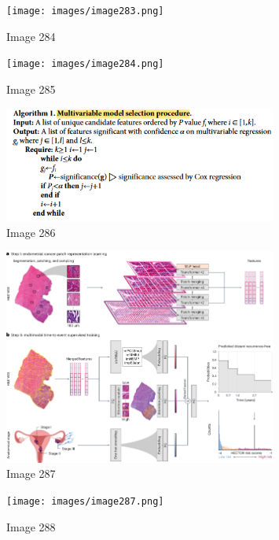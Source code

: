 \documentclass{article}%
\begin{document}
%


\begin{figure}[h!]%
\centering%
\texttt{[image: images/image283.png]}%
\caption{Image 284}%
\end{figure}

%


\begin{figure}[h!]%
\centering%
\texttt{[image: images/image284.png]}%
\caption{Image 285}%
\end{figure}

%


\begin{figure}[h!]%
\centering%
\includegraphics[width=0.8\textwidth]{images/image285.png}%
\caption{Image 286}%
\end{figure}

%


\begin{figure}[h!]%
\centering%
\includegraphics[width=0.8\textwidth]{images/image286.png}%
\caption{Image 287}%
\end{figure}

%


\begin{figure}[h!]%
\centering%
\texttt{[image: images/image287.png]}%
\caption{Image 288}%
\end{figure}
\end{document}
